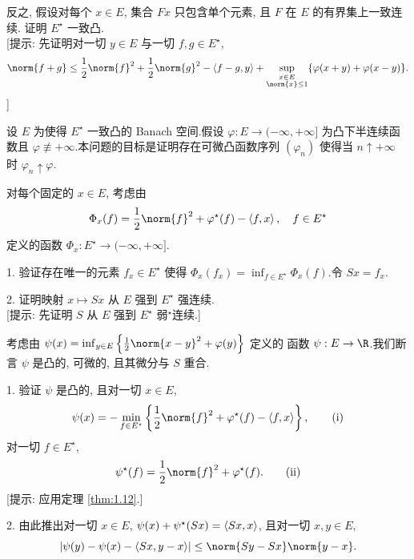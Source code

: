 \begin{problem}[第 1, 3 章]

反之, 假设对每个 $x\in E$, 集合 $Fx$ 只包含单个元素, 且 $F$ 在 $E$ 的有界集上一致连续.
证明 $E^\star$ 一致凸.\\
	{[提示: 先证明对一切 $y\in E$ 与一切 $f,g\in E^\star$,
	\begin{equation*}
	\norm{f+g}\le\frac12\norm{f}^2+\frac12\norm{g}^2-\dual{f-g}{y}+\sup_{\substack{x\in E\\\norm{x}\le1}}\{\varphi(x+y)+\varphi(x-y)\}.
	\end{equation*}]}
\end{problem}

\begin{problem}[第 1, 3 章]
\label{prob:14}
设 $E$ 为使得 $E^\star$ 一致凸的 Banach 空间.假设 $\varphi:E\to(-\infty,+\infty]$
为凸下半连续函数且 $\varphi\not\equiv+\infty$.本问题的目标是证明存在可微凸函数序列
$(\varphi_n)$ 使得当 $n\uparrow+\infty$ 时 $\varphi_n\uparrow\varphi$.


对每个固定的 $x\in E$, 考虑由
\begin{equation*}
\Phi_x(f)=\frac12\norm{f}^2+\varphi^\star(f)-\dual{f}{x},\quad f\in E^\star
\end{equation*}
定义的函数 $\Phi_x:E^\star\to(-\infty,+\infty]$.

1. 验证存在唯一的元素 $f_x\in E^\star$ 使得
$\Phi_x(f_x)=\inf_{f\in E^\star}\Phi_x(f)$.令 $Sx=f_x$.

2. 证明映射 $x\mapsto Sx$ 从 $E$ 强到 $E^\star$ 强连续.\\
{[提示: 先证明 $S$ 从 $E$ 强到 $E^\star$ 弱$^\star$连续.]}


考虑由 $\psi(x)=\inf_{y\in E}\left\{\frac12\norm{x-y}^2+\varphi(y)\right\}$ 定义的
函数 $\psi:E\to\R$.我们断言 $\psi$ 是凸的, 可微的, 且其微分与 $S$ 重合.

1. 验证 $\psi$ 是凸的, 且对一切 $x\in E$,
\begin{equation}
\psi(x)=-\min_{f\in E^\star}\left\{\frac12\norm{f}^2+\varphi^\star(f)-\dual{f}{x}\right\},
\tag{i}
\end{equation}
对一切 $f\in E^\star$,
\begin{equation}
\psi^\star(f)=\frac12\norm{f}^2+\varphi^\star(f).
\tag{ii}
\end{equation}
[提示: 应用定理  \ref{thm:1.12}.]

2. 由此推出对一切 $x\in E$, $\psi(x)+\psi^\star(Sx)=\left\langle Sx,x\right\rangle$, 且对一切 $x,y\in E$,
\begin{equation*}
\abs{\psi(y)-\psi(x)-\dual{Sx}{y-x}}\le\norm{Sy-Sx}\norm{y-x}.
\end{equation*}


\end{problem}
